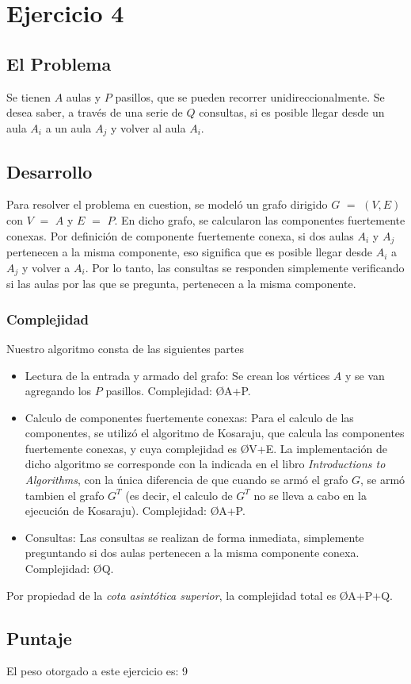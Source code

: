 \section{Ejercicio 4}
\subsection{El Problema}
Se tienen $A$ aulas y $P$ pasillos, que se pueden recorrer unidireccionalmente. Se desea saber, a través de una serie de $Q$ consultas, si es posible llegar desde un aula $A_{i}$ a un aula $A_{j}$ y volver al aula $A_{i}$.

\subsection{Desarrollo}
Para resolver el problema en cuestion, se modeló un grafo dirigido $G$ $=$ $(V,E)$ con $V$ $=$ $A$ y $E$ $=$ $P$.
En dicho grafo, se calcularon las componentes fuertemente conexas.
Por definición de componente fuertemente conexa, si dos aulas $A_{i}$ y $A_{j}$ pertenecen a la misma componente, eso significa que es posible llegar desde $A_{i}$ a $A_{j}$ y volver a $A_{i}$\textsuperscript{\cite{cfc}}.
Por lo tanto, las consultas se responden simplemente verificando si las aulas por las que se pregunta, pertenecen a la misma componente.

\subsubsection{Complejidad}
Nuestro algoritmo consta de las siguientes partes
\begin{itemize}
	\item Lectura de la entrada y armado del grafo: Se crean los vértices $A$ y se van agregando los $P$ pasillos. Complejidad: \O{A+P}.
	\item Calculo de componentes fuertemente conexas: Para el calculo de las componentes, se utilizó el algoritmo de Kosaraju, que calcula las componentes fuertemente conexas, y cuya complejidad es \O{V+E}\textsuperscript{\cite{cormen}}. La implementación de dicho algoritmo se corresponde con la indicada en el libro \emph{Introductions to Algorithms}\textsuperscript{\cite{cormen}}, con la única diferencia de que cuando se armó el grafo $G$, se armó tambien el grafo $G^T$ (es decir, el calculo de $G^T$ no se lleva a cabo en la ejecución de Kosaraju). Complejidad: \O{A+P}.
	\item Consultas: Las consultas se realizan de forma inmediata, simplemente preguntando si dos aulas pertenecen a la misma componente conexa. Complejidad: \O{Q}.
\end{itemize}

Por propiedad de la \emph{cota asintótica superior}, la complejidad total es \O{A+P+Q}.

\subsection{Puntaje}
El peso otorgado a este ejercicio es: 9